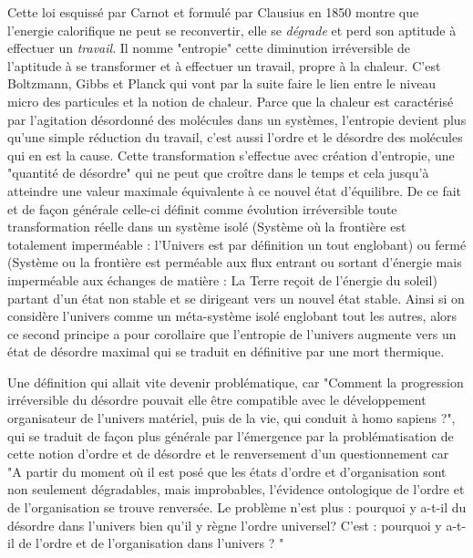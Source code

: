 Cette loi esquissé par Carnot  et formulé par Clausius en 1850 montre que l'energie calorifique ne peut se reconvertir, elle se \textit{dégrade} et perd son aptitude à effectuer un \textit{travail}. Il nomme "entropie" cette diminution irréversible de l'aptitude à se transformer et à effectuer un travail, propre à la chaleur.\autocite[35]{Morin1977} C'est Boltzmann, Gibbs et Planck qui vont par la suite faire le lien entre le niveau micro des particules et la notion de chaleur. Parce que la chaleur est caractérisé par l'agitation désordonné des molécules dans un systèmes, l'entropie devient plus qu'une simple réduction du travail, c'est aussi l'ordre et le désordre des molécules qui en est la cause. Cette transformation s'effectue avec création d'entropie, une "quantité de désordre" qui ne peut que croître dans le temps et cela jusqu'à atteindre une valeur maximale équivalente à ce nouvel état d'équilibre. De ce fait et de façon générale celle-ci définit comme évolution irréversible toute transformation réelle dans un système isolé (Système où la frontière est totalement imperméable : l'Univers est par définition un tout englobant) ou fermé (Système ou la frontière est perméable aux flux entrant ou sortant d'énergie mais imperméable aux échanges de matière : La Terre reçoit de l'énergie du soleil) partant d'un état non stable et se dirigeant vers un nouvel état stable.  Ainsi si on considère l'univers comme un méta-système isolé englobant tout les autres, alors ce second principe a pour corollaire que l'entropie de l'univers augmente vers un état de désordre maximal qui se traduit en définitive par une mort thermique.

Une définition qui allait vite devenir problématique, car "Comment la progression irréversible du désordre pouvait elle être compatible avec le développement organisateur de l'univers matériel, puis de la vie, qui conduit à homo sapiens ?", qui se traduit de façon plus générale par l'émergence par la problématisation de cette notion d'ordre et de désordre et le renversement d'un questionnement car "A partir du moment où il est posé que les états d'ordre et d'organisation sont non seulement dégradables, mais improbables, l'évidence ontologique de l'ordre et de l'organisation se trouve renversée. Le problème n'est plus : pourquoi y a-t-il du désordre dans l'univers bien qu'il y règne l'ordre universel? C'est : pourquoi y a-t-il de l'ordre et de l'organisation dans l'univers ? " \autocite[37]{Morin1977}

